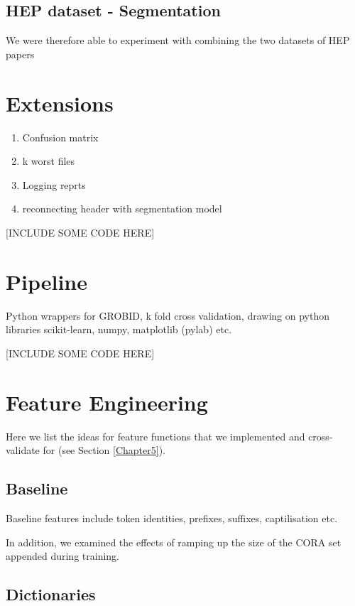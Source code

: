 \subsection{HEP dataset - Segmentation}
\label{subsec:hepdatasetsegmentation}

We were therefore able to experiment with combining the two datasets of HEP papers

\section{Extensions}

\begin{enumerate}
\item Confusion matrix
\item k worst files
\item Logging reprts
\item reconnecting header with segmentation model
\end{enumerate}

[INCLUDE SOME CODE HERE]

\section{Pipeline}

Python wrappers for GROBID, k fold cross validation, drawing on python libraries scikit-learn, numpy, matplotlib (pylab) etc.

[INCLUDE SOME CODE HERE]

\section{Feature Engineering}

Here we list the ideas for feature functions that we implemented and cross-validate for (see Section \ref{Chapter5}).

\subsection{Baseline}

Baseline features include token identities, prefixes, suffixes, captilisation etc.

In addition, we examined the effects of ramping up the size of the CORA set appended during training.

\subsection{Dictionaries}
